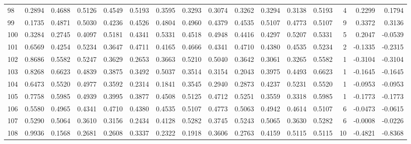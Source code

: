 \begin{tabular}{lrrrrrrrrrrrrrrr}
98  &      0.2894 &  0.4688 &  0.5126 &  0.4549 &  0.5193 &  0.3595 &  0.3293 &  0.3074 &  0.3262 &  0.3294 &   0.3138 &     0.5193 &      4 &                    0.2299 &                     0.1794 \\
99  &      0.1735 &  0.4871 &  0.5030 &  0.4236 &  0.4526 &  0.4804 &  0.4960 &  0.4379 &  0.4535 &  0.5107 &   0.4773 &     0.5107 &      9 &                    0.3372 &                     0.3136 \\
100 &      0.3284 &  0.2745 &  0.4097 &  0.5181 &  0.4341 &  0.5331 &  0.4518 &  0.4948 &  0.4416 &  0.4297 &   0.5207 &     0.5331 &      5 &                    0.2047 &                    -0.0539 \\
101 &      0.6569 &  0.4254 &  0.5234 &  0.3647 &  0.4711 &  0.4165 &  0.4666 &  0.4341 &  0.4710 &  0.4380 &   0.4535 &     0.5234 &      2 &                   -0.1335 &                    -0.2315 \\
102 &      0.8686 &  0.5582 &  0.5247 &  0.3629 &  0.2653 &  0.3663 &  0.5210 &  0.5040 &  0.3642 &  0.3061 &   0.3265 &     0.5582 &      1 &                   -0.3104 &                    -0.3104 \\
103 &      0.8268 &  0.6623 &  0.4839 &  0.3875 &  0.3492 &  0.5037 &  0.3514 &  0.3154 &  0.2043 &  0.3975 &   0.4493 &     0.6623 &      1 &                   -0.1645 &                    -0.1645 \\
104 &      0.6473 &  0.5520 &  0.4977 &  0.3592 &  0.2314 &  0.1841 &  0.3545 &  0.2940 &  0.2873 &  0.4237 &   0.5231 &     0.5520 &      1 &                   -0.0953 &                    -0.0953 \\
105 &      0.7758 &  0.5985 &  0.4939 &  0.3995 &  0.3877 &  0.4508 &  0.5125 &  0.4712 &  0.5251 &  0.3559 &   0.3318 &     0.5985 &      1 &                   -0.1773 &                    -0.1773 \\
106 &      0.5580 &  0.4965 &  0.4341 &  0.4710 &  0.4380 &  0.4535 &  0.5107 &  0.4773 &  0.5063 &  0.4942 &   0.4614 &     0.5107 &      6 &                   -0.0473 &                    -0.0615 \\
107 &      0.5290 &  0.5064 &  0.3610 &  0.3156 &  0.2434 &  0.4128 &  0.5282 &  0.3745 &  0.5243 &  0.5065 &   0.3630 &     0.5282 &      6 &                   -0.0008 &                    -0.0226 \\
108 &      0.9936 &  0.1568 &  0.2681 &  0.2608 &  0.3337 &  0.2322 &  0.1918 &  0.3606 &  0.2763 &  0.4159 &   0.5115 &     0.5115 &     10 &                   -0.4821 &                    -0.8368 \\

\end{tabular}
